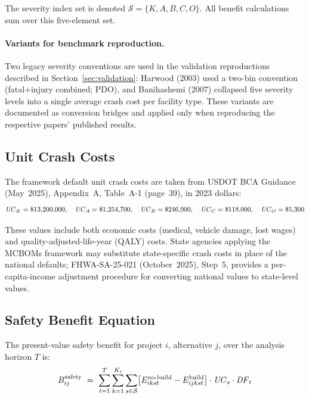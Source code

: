 The severity index set is denoted $\mathcal{S} = \{K, A, B, C, O\}$. All
benefit calculations sum over this five-element set.

\paragraph{Variants for benchmark reproduction.} Two legacy severity
conventions are used in the validation reproductions described in
Section~\ref{sec:validation}: Harwood (2003) used a two-bin convention
(fatal+injury combined; PDO), and Banihashemi (2007) collapsed five severity
levels into a single average crash cost per facility type. These variants are
documented as conversion bridges and applied only when reproducing the
respective papers' published results.

\subsection{Unit Crash Costs}

The framework default unit crash costs are taken from USDOT BCA Guidance
(May~2025), Appendix~A, Table~A-1 (page~39), in 2023 dollars:
\begin{equation*}
\mathit{UC}_K = \$13{,}200{,}000, \quad
\mathit{UC}_A = \$1{,}254{,}700, \quad
\mathit{UC}_B = \$246{,}900, \quad
\mathit{UC}_C = \$118{,}000, \quad
\mathit{UC}_O = \$5{,}300
\end{equation*}

These values include both economic costs (medical, vehicle damage, lost wages)
and quality-adjusted-life-year (QALY) costs. State agencies applying the
MCBOMs framework may substitute state-specific crash costs in place of the
national defaults; FHWA-SA-25-021 (October~2025), Step~5, provides a
per-capita-income adjustment procedure for converting national values to
state-level values.

\subsection{Safety Benefit Equation}

The present-value safety benefit for project $i$, alternative $j$, over the
analysis horizon $T$ is:
\begin{equation}
\Bsafety_{ij}\ =\ \sum_{t=1}^{T}\sum_{k=1}^{K_i}\sum_{s \in \mathcal{S}}
  \bigl[\Enobuild_{ikst} - \Ebuild_{ijkst}\bigr] \cdot \UC_s \cdot \DF_t
\label{eq:safety-benefit}
\end{equation}

